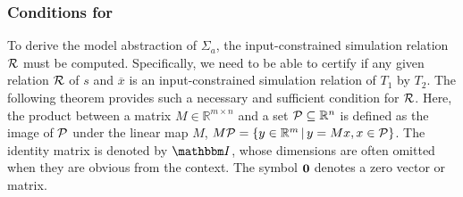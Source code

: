\subsubsection{Conditions for \RSet} %
\label{sec:abstraction-gs:feedforward:conditions}

To derive the model abstraction of $\Sigma_{a}$, the input-constrained simulation relation $\mathcal{R}$ must be computed.
Specifically, we need to be able to certify if any given relation $\mathcal{R}$ of $s$ and $\overbar{x}$ is an input-constrained simulation relation of $T_{1}$ by $T_{2}$.
The following theorem provides such a necessary and sufficient condition for $\mathcal{R}$.
Here, the product between a matrix $M \in \mathbb{R}^{m \times n}$ and a set $\mathcal{P} \subseteq \mathbb{R}^{n}$ is defined as the image of $\mathcal{P}$ under the linear map $M$, \ie $M \mathcal{P} = \{ y \in \mathbb{R}^{m} \,|\, y = M x, x \in \mathcal{P}\}$.
The identity matrix is denoted by $\IdentityMatrix$, whose dimensions are often omitted when they are obvious from the context.
The symbol $\mathbf{0}$ denotes a zero vector or matrix.

